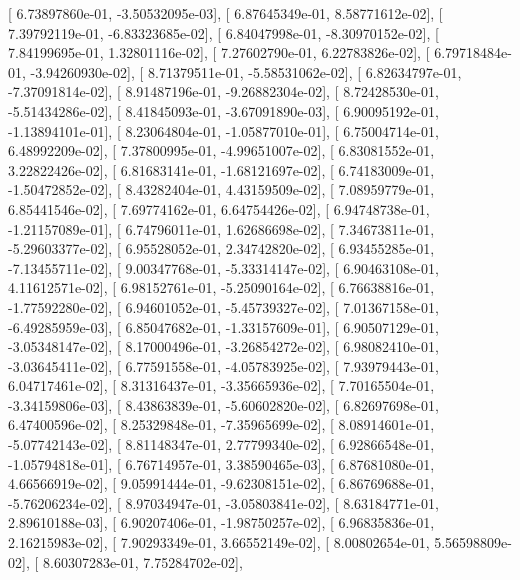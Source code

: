 \documentclass{article}
\begin{document}
       [  6.73897860e-01,  -3.50532095e-03],
       [  6.87645349e-01,   8.58771612e-02],
       [  7.39792119e-01,  -6.83323685e-02],
       [  6.84047998e-01,  -8.30970152e-02],
       [  7.84199695e-01,   1.32801116e-02],
       [  7.27602790e-01,   6.22783826e-02],
       [  6.79718484e-01,  -3.94260930e-02],
       [  8.71379511e-01,  -5.58531062e-02],
       [  6.82634797e-01,  -7.37091814e-02],
       [  8.91487196e-01,  -9.26882304e-02],
       [  8.72428530e-01,  -5.51434286e-02],
       [  8.41845093e-01,  -3.67091890e-03],
       [  6.90095192e-01,  -1.13894101e-01],
       [  8.23064804e-01,  -1.05877010e-01],
       [  6.75004714e-01,   6.48992209e-02],
       [  7.37800995e-01,  -4.99651007e-02],
       [  6.83081552e-01,   3.22822426e-02],
       [  6.81683141e-01,  -1.68121697e-02],
       [  6.74183009e-01,  -1.50472852e-02],
       [  8.43282404e-01,   4.43159509e-02],
       [  7.08959779e-01,   6.85441546e-02],
       [  7.69774162e-01,   6.64754426e-02],
       [  6.94748738e-01,  -1.21157089e-01],
       [  6.74796011e-01,   1.62686698e-02],
       [  7.34673811e-01,  -5.29603377e-02],
       [  6.95528052e-01,   2.34742820e-02],
       [  6.93455285e-01,  -7.13455711e-02],
       [  9.00347768e-01,  -5.33314147e-02],
       [  6.90463108e-01,   4.11612571e-02],
       [  6.98152761e-01,  -5.25090164e-02],
       [  6.76638816e-01,  -1.77592280e-02],
       [  6.94601052e-01,  -5.45739327e-02],
       [  7.01367158e-01,  -6.49285959e-03],
       [  6.85047682e-01,  -1.33157609e-01],
       [  6.90507129e-01,  -3.05348147e-02],
       [  8.17000496e-01,  -3.26854272e-02],
       [  6.98082410e-01,  -3.03645411e-02],
       [  6.77591558e-01,  -4.05783925e-02],
       [  7.93979443e-01,   6.04717461e-02],
       [  8.31316437e-01,  -3.35665936e-02],
       [  7.70165504e-01,  -3.34159806e-03],
       [  8.43863839e-01,  -5.60602820e-02],
       [  6.82697698e-01,   6.47400596e-02],
       [  8.25329848e-01,  -7.35965699e-02],
       [  8.08914601e-01,  -5.07742143e-02],
       [  8.81148347e-01,   2.77799340e-02],
       [  6.92866548e-01,  -1.05794818e-01],
       [  6.76714957e-01,   3.38590465e-03],
       [  6.87681080e-01,   4.66566919e-02],
       [  9.05991444e-01,  -9.62308151e-02],
       [  6.86769688e-01,  -5.76206234e-02],
       [  8.97034947e-01,  -3.05803841e-02],
       [  8.63184771e-01,   2.89610188e-03],
       [  6.90207406e-01,  -1.98750257e-02],
       [  6.96835836e-01,   2.16215983e-02],
       [  7.90293349e-01,   3.66552149e-02],
       [  8.00802654e-01,   5.56598809e-02],
       [  8.60307283e-01,   7.75284702e-02],
\end{document}
